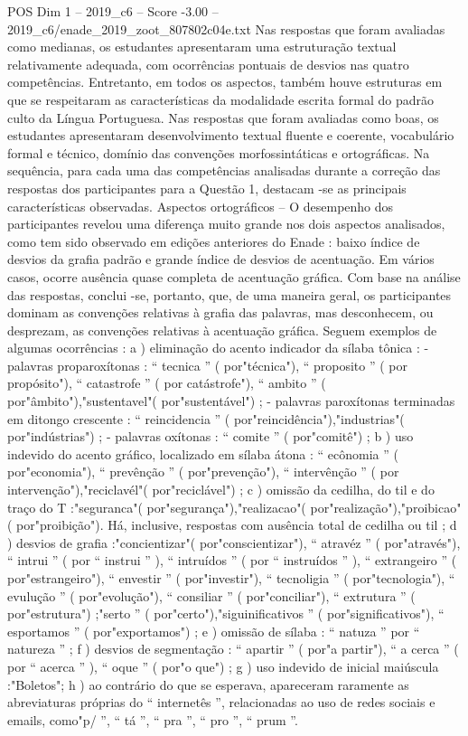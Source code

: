 \begin{textsample}{POS Dim 1 – 2019\_c6 – Score -3.00 – 2019\_c6/enade\_2019\_zoot\_807802c04e.txt}
Nas respostas que foram avaliadas como medianas, os estudantes apresentaram uma estruturação textual relativamente adequada, com ocorrências pontuais de desvios nas quatro competências.
Entretanto, em todos os aspectos, também houve estruturas em que se respeitaram as características da modalidade escrita formal do padrão culto da Língua Portuguesa.
Nas respostas que foram avaliadas como boas, os estudantes apresentaram desenvolvimento textual fluente e coerente, vocabulário formal e técnico, domínio das convenções morfossintáticas e ortográficas.
Na sequência, para cada uma das competências analisadas durante a correção das respostas dos participantes para a Questão 1, destacam -se as principais características observadas.
Aspectos ortográficos – O desempenho dos participantes revelou uma diferença muito grande nos dois aspectos analisados, como tem sido observado em edições anteriores do Enade : baixo índice de desvios da grafia padrão e grande índice de desvios de acentuação.
Em vários casos, ocorre ausência quase completa de acentuação gráfica.
Com base na análise das respostas, conclui -se, portanto, que, de uma maneira geral, os participantes dominam as convenções relativas à grafia das palavras, mas desconhecem, ou desprezam, as convenções relativas à acentuação gráfica.
Seguem exemplos de algumas ocorrências : a ) eliminação do acento indicador da sílaba tônica : - palavras proparoxítonas : “ tecnica ” ( por"técnica"), “ proposito ” ( por propósito"), “ catastrofe ” ( por catástrofe"), “ ambito ” ( por"âmbito"),"sustentavel"( por"sustentável") ; - palavras paroxítonas terminadas em ditongo crescente : “ reincidencia ” ( por"reincidência"),"industrias"( por"indústrias") ; - palavras oxítonas : “ comite ” ( por"comitê") ; b ) uso indevido do acento gráfico, localizado em sílaba átona : “ ecônomia ” ( por"economia"), “ prevênção ” ( por"prevenção"), “ intervênção ” ( por intervenção"),"reciclavél"( por"reciclável") ; c ) omissão da cedilha, do til e do traço do T :"seguranca"( por"segurança"),"realizacao"( por"realização"),"proibicao"( por"proibição").
Há, inclusive, respostas com ausência total de cedilha ou til ; d ) desvios de grafia :"concientizar"( por"conscientizar"), “ atravéz ” ( por"através"), “ intrui ” ( por “ instrui ” ), “ intruídos ” ( por “ instruídos ” ), “ extrangeiro ” ( por"estrangeiro"), “ envestir ” ( por"investir"), “ tecnoligia ” ( por"tecnologia"), “ evulução ” ( por"evolução"), “ consiliar ” ( por"conciliar"), “ extrutura ” ( por"estrutura") ;"serto ” ( por"certo"),"siguinificativos ” ( por"significativos"), “ esportamos ” ( por"exportamos") ; e ) omissão de sílaba : “ natuza ” por “ natureza ” ; f ) desvios de segmentação : “ apartir ” ( por"a partir"), “ a cerca ” ( por “ acerca ” ), “ oque ” ( por"o que") ; g ) uso indevido de inicial maiúscula :"Boletos"; h ) ao contrário do que se esperava, apareceram raramente as abreviaturas próprias do “ internetês ”, relacionadas ao uso de redes sociais e emails, como"p/ ”, “ tá ”, “ pra ”, “ pro ”, “ prum ”.

\end{textsample}
